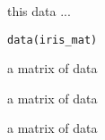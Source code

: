 \begin{Description}\relax
this data ...
\end{Description}
\begin{Usage}
\begin{verbatim}data(iris_mat)\end{verbatim}
\end{Usage}
\begin{Format}\relax
a matrix of data
\end{Format}
\begin{Source}\relax
a matrix of data
\end{Source}
\begin{References}\relax
a matrix of data
\end{References}

